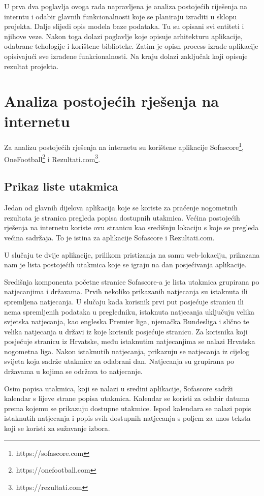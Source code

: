 \documentclass[times, utf8, zavrsni]{fer}
\begin{document}
U prva dva poglavlja ovoga rada napravljena je analiza postojećih riješenja na interntu i odabir glavnih funkcionalnosti koje se planiraju izraditi u sklopu projekta.
Dalje slijedi opis modela baze podataka. Tu su opisani svi entiteti i njihove veze. Nakon toga dolazi poglavlje koje opisuje arhitekturu aplikacije, odabrane tehologije i korištene biblioteke.
Zatim je opisn process izrade aplikacije opisivajući sve izrađene funkcionalnosti. Na kraju dolazi zaključak koji opisuje rezultat projekta.

\chapter{Analiza postojećih rješenja na internetu}
Za analizu postojećih rješenja na internetu su korištene aplikacije Sofascore\footnote{https://sofascore.com}, OneFootball\footnote{https://onefootball.com} i Rezultati.com\footnote{https://rezultati.com}.

\section{Prikaz liste utakmica}

Jedan od glavnih dijelova aplikacija koje se koriste za praćenje nogometnih rezultata je stranica pregleda popisa dostupnih utakmica.
Većina postojećih rješenja na internetu koriste ovu stranicu kao središnju lokaciju s koje se pregleda većina sadržaja. To je istina za aplikacije Sofascore i Rezultati.com.

U slučaju te dvije aplikacije, prilikom pristizanja na samu web-lokaciju, prikazana nam je lista postojećih utakmica koje se igraju na dan posjećivanja aplikacije.

Središnja komponenta početne stranice Sofascore-a je lista utakmica grupirana po natjecanjima i državama. Prvih nekoliko prikazanih natjecanja su istaknuta ili spremljena natjecanja.
U slučaju kada korisnik prvi put posjećuje stranicu ili nema spremljenih podataka u pregledniku, istaknuta natjecanja uključuju velika svjetska natjecanja,
kao engleska Premier liga, njemačka Bundesliga i slično te velika natjecanja u državi iz koje korisnik posjećuje stranicu.
Za korisnika koji posjećuje stranicu iz Hrvatske, među istaknutim natjecanjima se nalazi Hrvatska nogometna liga.
Nakon istaknutih natjecanja, prikazuju se natjecanja iz cijelog svijeta koja sadrže utakmice za odabrani dan. Natjecanja su grupirana po državama u kojima se održava to natjecanje.

Osim popisa utakmica, koji se nalazi u sredini aplikacije, Sofascore sadrži kalendar s lijeve strane popisa utakmica.
Kalendar se koristi za odabir datuma prema kojemu se prikazuju dostupne utakmice.
Ispod kalendara se nalazi popis istaknutih natjecanja i popis svih dostupnih natjecanja s poljem za unos teksta koji se koristi za sužavanje izbora.
\end{document}
